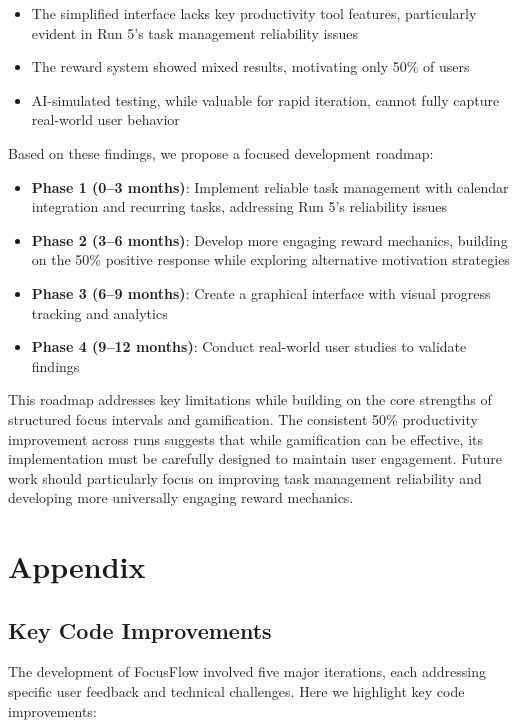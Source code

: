 \documentclass{article} %
\begin{document}
\begin{itemize}
    \item The simplified interface lacks key productivity tool features, particularly evident in Run 5's task management reliability issues
    \item The reward system showed mixed results, motivating only 50\% of users
    \item AI-simulated testing, while valuable for rapid iteration, cannot fully capture real-world user behavior
\end{itemize}

Based on these findings, we propose a focused development roadmap:

\begin{itemize}
    \item \textbf{Phase 1 (0--3 months)}: Implement reliable task management with calendar integration and recurring tasks, addressing Run 5's reliability issues
    \item \textbf{Phase 2 (3--6 months)}: Develop more engaging reward mechanics, building on the 50\% positive response while exploring alternative motivation strategies
    \item \textbf{Phase 3 (6--9 months)}: Create a graphical interface with visual progress tracking and analytics
    \item \textbf{Phase 4 (9--12 months)}: Conduct real-world user studies to validate findings
\end{itemize}

This roadmap addresses key limitations while building on the core strengths of structured focus intervals and gamification. The consistent 50\% productivity improvement across runs suggests that while gamification can be effective, its implementation must be carefully designed to maintain user engagement. Future work should particularly focus on improving task management reliability and developing more universally engaging reward mechanics.

\section{Appendix}
\label{sec:appendix}

\subsection{Key Code Improvements}
The development of FocusFlow involved five major iterations, each addressing specific user feedback and technical challenges. Here we highlight key code improvements:
\end{document}
